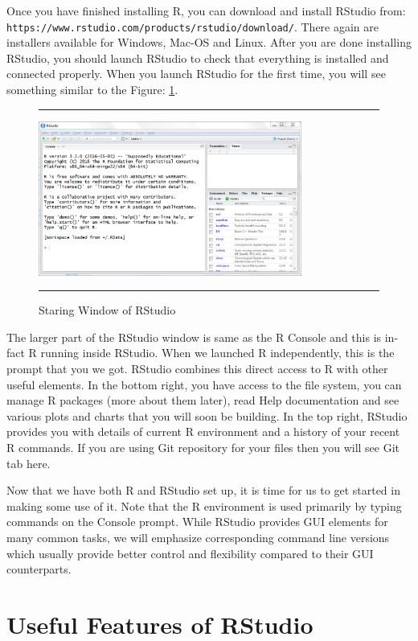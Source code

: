\documentclass[10pt, letterpaper, twoside]{memoir}\usepackage{knitr}
\begin{document}
Once you have finished installing R, you can download and install RStudio from: \\ 
\verb|https://www.rstudio.com/products/rstudio/download/|. There again are installers available for Windows, Mac-OS and Linux. After you are done installing RStudio, you should launch RStudio to check that everything is installed and connected properly. When you launch RStudio for the first time, you will see something similar to the Figure: \ref{fig:rstudio}.

\begin{figure}
\rule{4in}{1pt}
\centering
\includegraphics[height=2in]{images/rstudio.png}
\caption{Staring Window of RStudio}
\label{fig:rstudio}
\rule{4in}{1pt}
\end{figure}

The larger part of the RStudio window is same as the R Console and this is in-fact R running inside RStudio. When we launched R independently, this is the prompt that you we got. RStudio combines this direct access to R with other useful elements. In the bottom right, you have access to the file system, you can manage R packages (more about them later), read Help documentation and see various plots and charts that you will soon be building. In the top right, RStudio provides you with details of current R environment and a history of your recent R commands. If you are using Git repository for your files then you will see Git tab here.

Now that we have both R and RStudio set up, it is time for us to get started in making some use of it. Note that the R environment is used primarily by typing commands on the Console prompt. While RStudio provides GUI elements for many common tasks, we will emphasize corresponding command line versions which usually provide better control and flexibility compared to their GUI counterparts. 

\section{Useful Features of RStudio}
\end{document}
